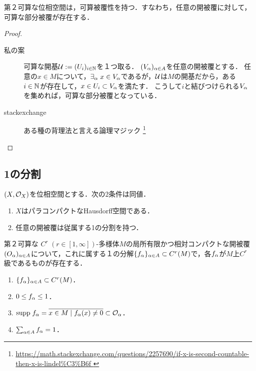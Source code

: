 \documentclass[uplatex,dvipdfmx]{jsreport}
\begin{document}
\begin{lemma}
    第２可算な位相空間は，可算被覆性を持つ．すなわち，任意の開被覆に対して，可算な部分被覆が存在する．
\end{lemma}
\begin{proof}\mbox{}
    \begin{description}
        \item[私の案] 可算な開基$\mathcal{U}:=(U_i)_{i\in\mathbb{N}}$を１つ取る．
        $(V_\alpha)_{\alpha\in A}$を任意の開被覆とする．
        任意の$x\in M$について，$\exists_{\alpha}\;x\in V_\alpha$であるが，$\mathcal{U}$は$M$の開基だから，ある$i\in\mathbb{N}$が存在して，$x\in U_i\subset V_\alpha$を満たす．
        こうして$i$と結びつけられる$V_\alpha$を集めれば，可算な部分被覆となっている． 
        \item[stackexchange] ある種の背理法と言える論理マジック
    \footnote{\url{
        https://math.stackexchange.com/questions/2257690/if-x-is-second-countable-then-x-is-lindel%
    }}
    \end{description}
\end{proof}

\subsection{1の分割}

\begin{proposition}
    $(X,\mathcal{O}_X)$を位相空間とする．次の2条件は同値．
    \begin{enumerate}
        \item $X$はパラコンパクトなHausdorff空間である．
        \item 任意の開被覆は従属する1の分割を持つ．
    \end{enumerate}
\end{proposition}

\begin{theorem}
    第２可算な
    $C^r\;(r\in[1,\infty])$-多様体$M$の局所有限かつ相対コンパクトな開被覆$(O_\alpha)_{\alpha\in A}$について，これに属する１の分解$\{f_\alpha\}_{\alpha\in A}\subset C^r(M)$で，各$f_\alpha$が$M$上$C^r$級であるものが存在する．
    \begin{enumerate}
        \item $\{f_\alpha\}_{\alpha\in A}\subset C^r(M)$．
        \item $0\le f_\alpha\le 1$．
        \item $\mathrm{supp}\; f_\alpha=\overline{x\in M\mid f_\alpha(x)\ne 0}\subset\mathcal{O}_\alpha$．
        \item $\sum_{\alpha\in A}f_\alpha=1$．
    \end{enumerate}
\end{theorem}
\end{document}
